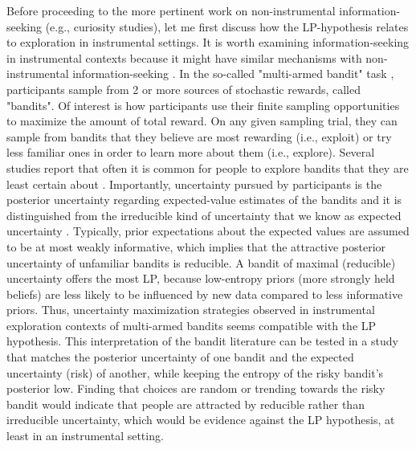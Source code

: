 Before proceeding to the more pertinent work on non-instrumental information-seeking (e.g., curiosity studies), let me first discuss how the \ac{LP}-hypothesis relates to exploration in instrumental settings. It is worth examining information-seeking in instrumental contexts because it might have similar mechanisms with non-instrumental information-seeking \cite{gottlieb_towards_2018,gottlieb_curiosity_2020}. In the so-called "multi-armed bandit" task \cite[see ][]{averbeck_theory_2015}, participants sample from 2 or more sources of stochastic rewards, called "bandits". Of interest is how participants use their finite sampling opportunities to maximize the amount of total reward. On any given sampling trial, they can sample from bandits that they believe are most rewarding (i.e., exploit) or try less familiar ones in order to learn more about them (i.e., explore). Several studies report that often it is common for people to explore bandits that they are least certain about \cite{speekenbrink_uncertainty_2015,gershman_deconstructing_2018,schulz_structured_2019}. Importantly, uncertainty pursued by participants is the posterior uncertainty regarding expected-value estimates of the bandits and it is distinguished from the irreducible kind of uncertainty that we know as expected uncertainty \cite{schulz_algorithmic_2019}. Typically, prior expectations about the expected values are assumed to be at most weakly informative, which implies that the attractive posterior uncertainty of unfamiliar bandits is reducible. A bandit of maximal (reducible) uncertainty offers the most \ac{LP}, because low-entropy priors (more strongly held beliefs) are less likely to be influenced by new data compared to less informative priors. Thus, uncertainty maximization strategies observed in instrumental exploration contexts of multi-armed bandits seems compatible with the \ac{LP} hypothesis. This interpretation of the bandit literature can be tested in a study that matches the posterior uncertainty of one bandit and the expected uncertainty (risk) of another, while keeping the entropy of the risky bandit's posterior low. Finding that choices are random or trending towards the risky bandit would indicate that people are attracted by reducible rather than irreducible uncertainty, which would be evidence against the \ac{LP} hypothesis, at least in an instrumental setting. 

